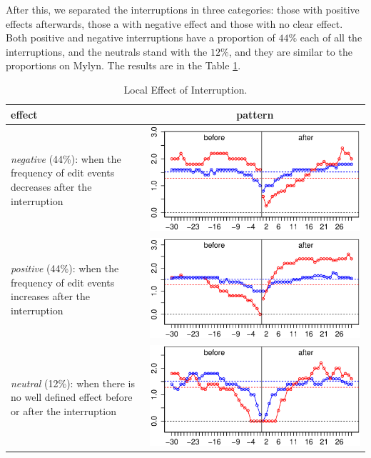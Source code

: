 \documentclass[times]{smrauth}
\begin{document}
After this, we separated the interruptions in three categories: those with positive effects afterwards, those a with negative effect and those with no clear effect. Both positive and negative interruptions have a proportion of $44\%$ each of all the interruptions, and the neutrals stand with the $12\%$, and they are similar to the proportions on Mylyn. The results are in the Table \ref{tbl:local_effect_udc}. 

\begin{table}[ht!]
\caption{Local Effect of Interruption. }
\label{tbl:local_effect_udc}
\centering
\begin{tabular}{p{4cm} | c}
effect & pattern \\
\hline
\textit{negative} (44\%): when the frequency of edit events decreases after the interruption
	& \includegraphics[valign=m,scale=0.25]{figures/udc_neg_ints_2} \\
\textit{positive} (44\%): when the frequency of edit events increases after the interruption 
	& \includegraphics[valign=m,scale=0.25]{figures/udc_pos_ints_2} \\
\textit{neutral} (12\%): when there is no well defined effect before or after the interruption 
	& \includegraphics[valign=m,scale=0.25]{figures/udc_neu_ints_2} 
\end{tabular}
\end{table}
\end{document}
